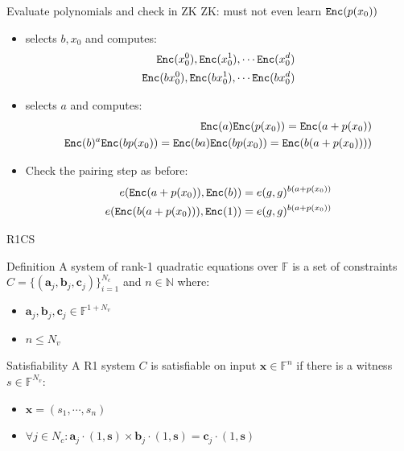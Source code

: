 \documentclass[handout]{beamer}
\begin{document}
\begin{frame}{Evaluate polynomials and check in ZK}
ZK: \ver must not even learn $\mathtt{Enc}(p(x_0))$ 
\begin{itemize}
    \item \ver selects $b,x_0$ and computes:   \begin{align*}
        \mathtt{Enc}(x_0^0),\mathtt{Enc}(x_0^1),\cdots \mathtt{Enc}(x_0^d)    \\
         \mathtt{Enc}(bx_0^0),\mathtt{Enc}(bx_0^1),\cdots \mathtt{Enc}(bx_0^d) \end{align*}
    \item \prv selects $a$ and computes:  
        \begin{align*}
        \mathtt{Enc}(a)\mathtt{Enc}(p(x_0)) = \mathtt{Enc}(a+p(x_0)) \\
        \mathtt{Enc}(b)^a \mathtt{Enc}(bp(x_0)) = \mathtt{Enc}(ba)\mathtt{Enc}(bp(x_0)) = \mathtt{Enc}(b(a+p(x_0))))
        \end{align*}
    \item Check the pairing step as before:
        \begin{align*}
        e(\mathtt{Enc}(a+p(x_0)),\mathtt{Enc}(b))=e(g,g)^{b(a+p(x_0))} \\
        e(\mathtt{Enc}(b(a+p(x_0))),\mathtt{Enc}(1))=e(g,g)^{b(a+p(x_0))} 
        \end{align*}
\end{itemize}
\end{frame}

\begin{frame}{R1CS}

\begin{block}{Definition}
A system of rank-1 quadratic equations over $\mathbb{F}$ is a set of constraints $C  = \{ (\bm{a}_j, \bm{b}_j, \bm{c}_j) \}_{i=1}^{N_c} $ and $n \in \mathbb{N}$ where:
\begin{itemize}
    \item $\bm{a}_j,\bm{b}_j,\bm{c}_j \in \mathbb{F}^{1+N_v}$
    \item $n \leq N_v$
\end{itemize}
\end{block}

\begin{block}{Satisfiability}
A R1 system $C$ is satisfiable on input $\bm{x} \in \mathbb{F}^n$ if there is a witness $s \in \mathbb{F}^{N_v}:$
\begin{itemize}
    \item $\bm{x} = (s_1, \cdots, s_n)$
    \item $\forall j \in N_c:  \bm{a}_j \cdotp (1,\bm{s})  \times  \bm{b}_j \cdotp (1,\bm{s})  =  \bm{c}_j \cdotp (1,\bm{s})$
\end{itemize}
\end{block}  
\end{frame}
\end{document}
